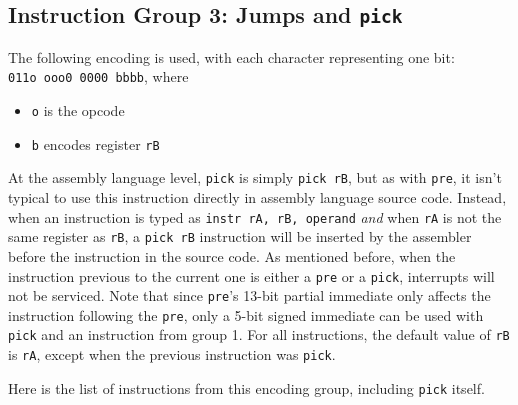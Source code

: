 \documentclass{article}
\begin{document}
	\doublespacing
	\subsection{Instruction Group 3:  Jumps and \texttt{pick}}
	The following encoding is used, with each character representing one
	bit:  \\
	\texttt{011o ooo0 0000 bbbb}, where

	\singlespacing
	\begin{itemize}
		\item \texttt{o} is the opcode
		\item \texttt{b} encodes register \texttt{rB}
	\end{itemize}

	\doublespacing

	At the assembly language level, \texttt{pick} is simply
	\texttt{pick rB}, but as with \texttt{pre}, it isn't typical to use
	this instruction directly in assembly language source code.  Instead,
	when an instruction is typed as \texttt{instr rA, rB, operand}
	\textit{and} when \texttt{rA} is not the same register as \texttt{rB},
	a \texttt{pick rB} instruction will be inserted by the assembler before
	the instruction in the source code.  As mentioned before, when the
	instruction previous to the current one is either a \texttt{pre} or a
	\texttt{pick}, interrupts will not be serviced.  Note that since
	\texttt{pre}'s 13-bit partial immediate only affects the instruction
	following the \texttt{pre}, only a 5-bit signed immediate can be used
	with \texttt{pick} and an instruction from group 1.  For all
	instructions, the default value of \texttt{rB} is \texttt{rA}, except
	when the previous instruction was \texttt{pick}.

	Here is the list of instructions from this encoding group, including
	\texttt{pick} itself.
\end{document}
